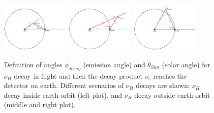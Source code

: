 \documentclass[%
 reprint,
 amsmath,amssymb,
 aps,
 prd,
twocolumn,
]{revtex4-1}
\begin{document}


\begin{figure}[!ht]
    \includegraphics[width=0.3\textwidth]{figs/decay_inflight_sketch1.png}
    \includegraphics[width=0.3\textwidth]{figs/decay_inflight_sketch2.png}
    \includegraphics[width=0.3\textwidth]{figs/decay_inflight_sketch3.png}
\caption{Definition of angles $\phi_{decay}$ (emission angle) and $\theta_{Sun}$ (solar angle) for $\nu_H$ decay in flight and then the decay product $\nu_e$ reaches the detector on earth. Different scenarios of $\nu_H$ decays are shown: $\nu_H$ decay inside earth orbit (left plot), and $\nu_H$ decay outside earth orbit (middle and right plot).}
\label{fig:decay_inflight_sketch} 
\end{figure}
\end{document}

